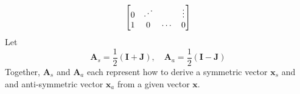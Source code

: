 \begin{enumerate}[label=(\alph*)]
\begin{tcolorbox}
$$\begin{bmatrix}
				      0      & \reflectbox{$\ddots$} &                       & \vdots \\
				      1      & 0                     & \cdots                & 0
			      \end{bmatrix}
		      $$
		      Let
		      $$
			      \mathbf{A}_s = \frac{1}{2} \left( \mathbf{I} + \mathbf{J} \right), \quad
			      \mathbf{A}_a = \frac{1}{2} \left( \mathbf{I} - \mathbf{J} \right)
		      $$
		      Together, $\mathbf{A}_s$ and $\mathbf{A}_a$ each represent how to
		      derive a symmetric vector $\mathbf{x}_s$ and and anti-symmetric vector
		      $\mathbf{x}_a$ from a given vector $\mathbf{x}$.
	      \end{tcolorbox}
\end{enumerate}
